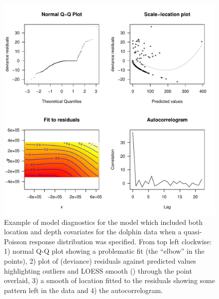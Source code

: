\documentclass[a4paper,12pt]{article}
\begin{document}
\begin{figure}[h!]
  \caption{Example of model diagnostics for the model which included both location and depth covariates for the dolphin data when a quasi-Poisson response distribution was specified. From top left clockwise:  1) normal Q-Q plot showing a problematic fit (the ``elbow'' in the points), 2) plot of (deviance) residuals against predicted values highlighting outliers and LOESS smooth (\cite{Cleveland:1979vd}) through the point overlaid, 3) a smooth of location fitted to the residuals showing some pattern left in the data and 4) the autocorrelogram. }
  \label{dsm-check}
  \begin{center}
    \includegraphics[width=\textwidth]{figs/dsm-check}
  \end{center}
\end{figure}
\end{document}
